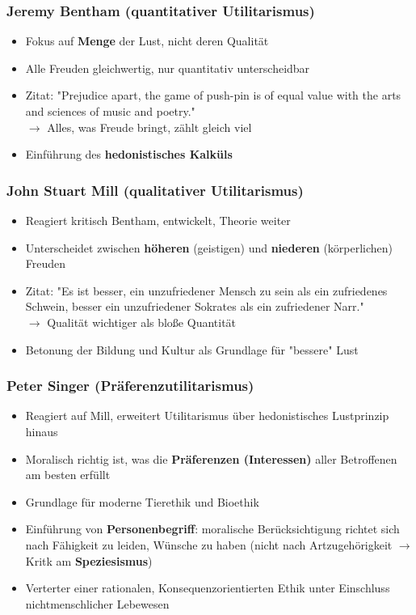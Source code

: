 \subsubsection{Jeremy Bentham (quantitativer Utilitarismus)}

\begin{itemize}
    \item Fokus auf \textbf{Menge} der Lust, nicht deren Qualität
    \item Alle Freuden gleichwertig, nur quantitativ unterscheidbar
    \item Zitat: "Prejudice apart, the game of push-pin is of equal value with the arts and sciences of music and poetry." \\
        $\rightarrow$ Alles, was Freude bringt, zählt gleich viel
    \item Einführung des \textbf{hedonistisches Kalküls}
\end{itemize}


\subsubsection{John Stuart Mill (qualitativer Utilitarismus)}
\begin{itemize}
    \item Reagiert kritisch Bentham, entwickelt, Theorie weiter
    \item Unterscheidet zwischen \textbf{höheren} (geistigen) und \textbf{niederen} (körperlichen) Freuden
    \item Zitat: "Es ist besser, ein unzufriedener Mensch zu sein als ein zufriedenes Schwein, besser ein unzufriedener Sokrates als ein zufriedener Narr." \\
    $\rightarrow$ Qualität wichtiger als bloße Quantität
    \item Betonung der Bildung und Kultur als Grundlage für "bessere" Lust
\end{itemize}


\subsubsection{Peter Singer (Präferenzutilitarismus)}
\begin{itemize}
    \item Reagiert auf Mill, erweitert Utilitarismus über hedonistisches Lustprinzip hinaus
    \item Moralisch richtig ist, was die \textbf{Präferenzen (Interessen)} aller Betroffenen am besten erfüllt
    \item Grundlage für moderne Tierethik und Bioethik
    \item Einführung von \textbf{Personenbegriff}: moralische Berücksichtigung richtet sich nach Fähigkeit zu leiden, Wünsche zu haben (nicht nach Artzugehörigkeit $\rightarrow$ Kritk am \textbf{Speziesismus})
    \item Verterter einer rationalen, Konsequenzorientierten Ethik unter Einschluss nichtmenschlicher Lebewesen
\end{itemize}


